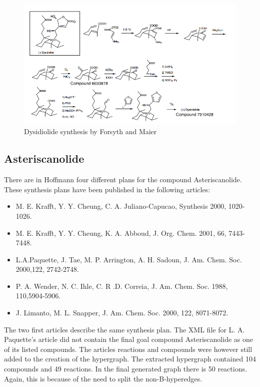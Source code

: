 \documentclass[a4paper,10pt,titlepage]{paper}
\begin{document}
\begin{figure}
\centering
\includegraphics[scale=0.5, angle=90]{Synteseplaner/Dysidiolide/Forsyth.png}
\caption{Dysidiolide synthesis by Forsyth and Maier \cite{SynthesisPlans}}
\label{fig::Forsyth}
\end{figure}

\subsection{Asteriscanolide}
There are in Hoffmann\cite{SynthesisPlans} four different plans for the compound Asteriscanolide. These synthesis plans have been published in the following articles:
\begin{itemize}
\item
M. E. Krafft, Y. Y. Cheung, C. A. Juliano-Capucao, Synthesis 2000, 1020-1026.
\item
M. E. Krafft, Y. Y. Cheung, K. A. Abboud, J. Org. Chem. 2001, 66, 7443-7448.
\item
L.A.Paquette, J. Tae, M. P. Arrington, A. H. Sadoun, J. Am. Chem. Soc. 2000,122,
2742-2748.
\item
P. A. Wender, N. C. Ihle, C. R .D. Correia, J. Am. Chem. Soc. 1988, 110,5904-5906.
\item
J. Limanto, M. L. Snapper, J. Am. Chem. Soc. 2000, 122, 8071-8072.
\end{itemize}
The two first articles describe the same synthesis plan. The XML file for L. A. Paquette's article did not contain the final goal compound Asteriscanolide as one of its listed compounds. The articles reactions and compounds were however still added to the creation of the hypergraph.
The extracted hypergraph contained 104 compounds and 49 reactions. In the final generated graph there is 50 reactions. Again, this is because of the need to split the non-B-hyperedges.
\end{document}
